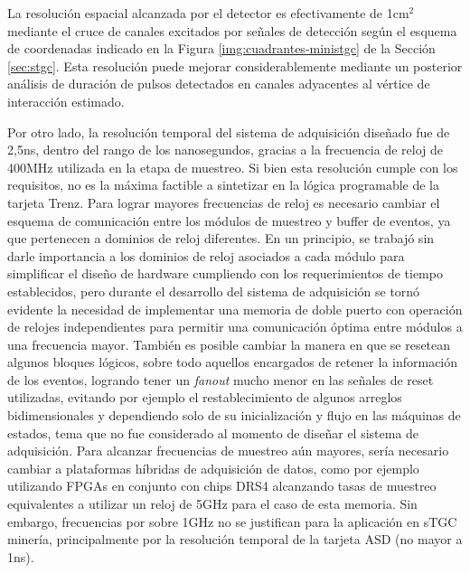 La resolución espacial alcanzada por el detector es efectivamente de 1cm$^2$ mediante el cruce de canales excitados por señales de detección según el esquema de coordenadas indicado en la Figura \ref{img:cuadrantes-ministgc} de la Sección \ref{sec:stgc}. Esta resolución puede mejorar considerablemente mediante un posterior análisis de duración de pulsos detectados en canales adyacentes al vértice de interacción estimado. 

Por otro lado, la resolución temporal del sistema de adquisición diseñado fue de 2,5ns, dentro del rango de los nanosegundos, gracias a la frecuencia de reloj de 400MHz utilizada en la etapa de muestreo. Si bien esta resolución cumple con los requisitos, no es la máxima factible a sintetizar en la lógica programable de la tarjeta Trenz. Para lograr mayores frecuencias de reloj es necesario cambiar el esquema de comunicación entre los módulos de muestreo y buffer de eventos, ya que pertenecen a dominios de reloj diferentes. En un principio, se trabajó sin darle importancia a los dominios de reloj asociados a cada módulo para simplificar el diseño de hardware cumpliendo con los requerimientos de tiempo establecidos, pero durante el desarrollo del sistema de adquisición se tornó evidente la necesidad de implementar una memoria de doble puerto con operación de relojes independientes para permitir una comunicación óptima entre módulos a una frecuencia mayor. También es posible cambiar la manera en que se resetean algunos bloques lógicos, sobre todo aquellos encargados de retener la información de los eventos, logrando tener un \textit{fanout} mucho menor en las señales de reset utilizadas, evitando por ejemplo el restablecimiento de algunos arreglos bidimensionales y dependiendo solo de su inicialización y flujo en las máquinas de estados, tema que no fue considerado al momento de diseñar el sistema de adquisición. Para alcanzar frecuencias de muestreo aún mayores, sería necesario cambiar a plataformas híbridas de adquisición de datos, como por ejemplo utilizando FPGAs en conjunto con chips DRS4\cite{RittDRS4Array} alcanzando tasas de muestreo equivalentes a utilizar un reloj de 5GHz para el caso de esta memoria. Sin embargo, frecuencias por sobre 1GHz no se justifican para la aplicación en sTGC minería, principalmente por la resolución temporal de la tarjeta ASD (no mayor a 1ns).

